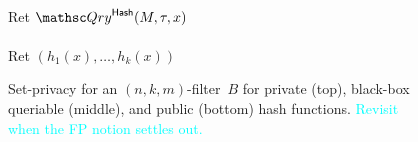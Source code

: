 \begin{figure}
{{\medskip
{}\\
Ret $\Qry^{\HashOracle}(M,\tau,x)$\\

\medskip
{}\\
Ret $\left(h_1(x),\ldots,h_k(x)\right)$\\
}
}
\caption{Set-privacy for an $(n,k,m)$-filter~$B$ for private (top), black-box queriable (middle),  and public (bottom) hash functions. \textcolor{cyan}{Revisit when the FP notion settles out.}}
\label{fig:fp-filter}
\end{figure}
